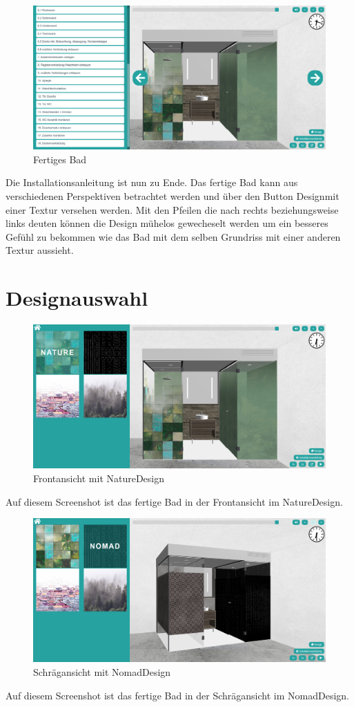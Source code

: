 \clearpage \newpage
\begin{figure}[h]
    \centering
    \includegraphics[width=1\linewidth]{images/screenshots/09.png}
    \caption{Fertiges Bad}
    \label{}
\end{figure}
\noindent Die Installationsanleitung ist nun zu Ende. Das fertige Bad kann aus verschiedenen Perspektiven betrachtet werden und über den Button \dq Design\dq mit einer Textur versehen werden. Mit den Pfeilen die nach rechts beziehungsweise links deuten können die Design mühelos gewecheselt werden um ein besseres Gefühl zu bekommen wie das Bad mit dem selben Grundriss mit einer anderen Textur aussieht.

\clearpage \newpage

\section*{Designauswahl}
\begin{figure}[h]
    \centering
    \includegraphics[width=1\linewidth]{images/screenshots/10.jpg}
    \caption{Frontansicht mit \dq Nature\dq Design}
    \label{}
\end{figure}
\noindent Auf diesem Screenshot ist das fertige Bad in der Frontansicht im \dq Nature\dq Design.

\begin{figure}[h]
    \centering
    \includegraphics[width=1\linewidth]{images/screenshots/11.jpg}
    \caption{Schrägansicht mit \dq Nomad\dq Design}
    \label{}
\end{figure}
\noindent Auf diesem Screenshot ist das fertige Bad in der Schrägansicht im \dq Nomad\dq Design.